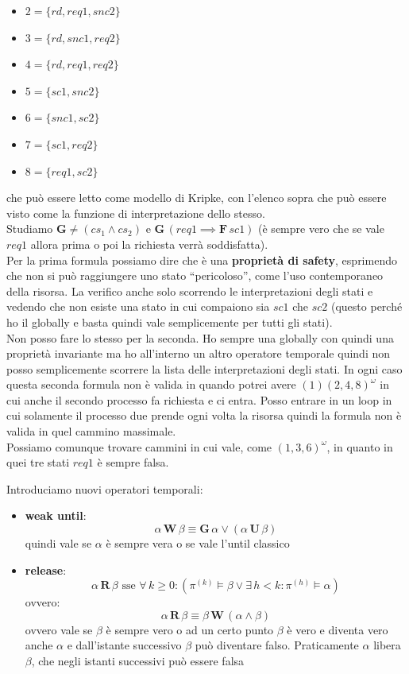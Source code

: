 \begin{esempio}
\begin{itemize}
    \item $2=\{rd, req1, snc2\}$
    \item $3=\{rd, snc1, req2\}$
    \item $4=\{rd, req1, req2\}$
    \item $5=\{sc1, snc2\}$
    \item $6=\{snc1, sc2\}$
    \item $7=\{sc1, req 2\}$
    \item $8=\{req1, sc2\}$
  \end{itemize}
  che può essere letto come modello di Kripke, con l'elenco sopra che può
  essere visto come la funzione di interpretazione dello stesso.\\
  Studiamo $\mathbf{G}\neq (cs_1\land cs_2)$ e $\mathbf{G}\,(req1\implies
  \mathbf{F}\, sc1)$ (è sempre vero che se vale $req1$ allora prima o poi la
  richiesta verrà soddisfatta).\\
  Per la prima formula possiamo dire che è una \textbf{proprietà di safety},
  esprimendo che non si può raggiungere uno stato ``pericoloso'', come l'uso
  contemporaneo della risorsa. La verifico anche solo scorrendo le
  interpretazioni degli stati e vedendo che non esiste una stato in cui
  compaiono sia $sc1$ che $sc2$ (questo perché ho il globally e basta quindi
  vale semplicemente per tutti gli stati). \\
  Non posso fare lo stesso per la seconda. Ho sempre una globally con quindi
  una proprietà invariante ma ho all'interno un altro operatore temporale
  quindi non posso semplicemente scorrere la lista delle interpretazioni degli
  stati. In ogni caso questa seconda formula non è valida in quando potrei
  avere $(1)(2, 4, 8)^\omega$ in cui anche il secondo processo fa richiesta e ci
  entra. Posso entrare in un loop in cui solamente il processo
  due prende ogni volta la risorsa quindi la formula non è valida in quel
  cammino massimale.\\
  Possiamo comunque trovare cammini in cui vale, come $(1, 3, 6)^\omega$, in
  quanto in quei tre stati $req1$ è sempre falsa.
\end{esempio}
Introduciamo nuovi operatori temporali:
\begin{itemize}
  \item \textbf{weak until}:
  \[\alpha\,\mathbf{W}\,\beta\equiv \mathbf{G}\,\alpha\lor
    (\alpha\,\mathbf{U}\,\beta)\]
  quindi vale se $\alpha$ è sempre vera o se vale l'until classico
  \item \textbf{release}:
  \[\alpha\,\mathbf{R}\,\beta\mbox{ sse }\forall\, k\geq 0:(\pi^{(k)}\vDash
    \beta\lor \exists\, h<k:\pi^{(h)}\vDash \alpha)\]
  ovvero:
  \[\alpha\,\mathbf{R}\,\beta\equiv \beta\,\mathbf{W}\,(\alpha\land \beta)\]
  ovvero vale se $\beta$ è sempre vero o ad un certo punto $\beta$ è vero e
  diventa vero anche $\alpha$ e dall'istante successivo $\beta$ può diventare
  falso. Praticamente $\alpha$ libera $\beta$, che negli istanti successivi può
  essere falsa
\end{itemize}
